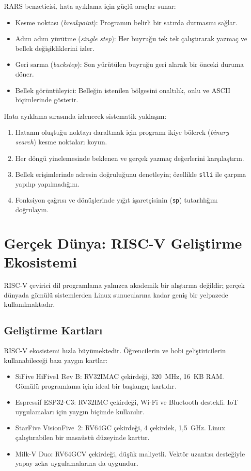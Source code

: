 RARS benzeticisi, hata ayıklama için güçlü araçlar sunar:

\begin{itemize}
\item Kesme noktası (\emph{breakpoint}): Programın belirli bir satırda durmasını sağlar.
\item Adım adım yürütme (\emph{single step}): Her buyruğu tek tek çalıştırarak yazmaç ve bellek değişikliklerini izler.
\item Geri sarma (\emph{backstep}): Son yürütülen buyruğu geri alarak bir önceki duruma döner.
\item Bellek görüntüleyici: Belleğin istenilen bölgesini onaltılık, onlu ve ASCII biçimlerinde gösterir.
\end{itemize}

Hata ayıklama sırasında izlenecek sistematik yaklaşım:
\begin{enumerate}
\item Hatanın oluştuğu noktayı daraltmak için programı ikiye bölerek (\emph{binary search}) kesme noktaları koyun.
\item Her döngü yinelemesinde beklenen ve gerçek yazmaç değerlerini karşılaştırın.
\item Bellek erişimlerinde adresin doğruluğunu denetleyin; özellikle \texttt{slli} ile çarpma yapılıp yapılmadığını.
\item Fonksiyon çağrısı ve dönüşlerinde yığıt işaretçisinin (\texttt{sp}) tutarlılığını doğrulayın.
\end{enumerate}


\section{Gerçek Dünya: RISC-V Geliştirme Ekosistemi}
\label{sec:gercek-dunya-programlama}

RISC-V çevirici dil programlama yalnızca akademik bir alıştırma değildir; gerçek dünyada gömülü sistemlerden Linux sunucularına kadar geniş bir yelpazede kullanılmaktadır.

\subsection{Geliştirme Kartları}

RISC-V ekosistemi hızla büyümektedir. Öğrencilerin ve hobi geliştiricilerin kullanabileceği bazı yaygın kartlar:

\begin{itemize}
\item SiFive HiFive1 Rev B: RV32IMAC çekirdeği, 320~MHz, 16~KB RAM. Gömülü programlama için ideal bir başlangıç kartıdır.
\item Espressif ESP32-C3: RV32IMC çekirdeği, Wi-Fi ve Bluetooth destekli. IoT uygulamaları için yaygın biçimde kullanılır.
\item StarFive VisionFive~2: RV64GC çekirdeği, 4 çekirdek, 1,5~GHz. Linux çalıştırabilen bir masaüstü düzeyinde karttır.
\item Milk-V Duo: RV64GCV çekirdeği, düşük maliyetli. Vektör uzantısı desteğiyle yapay zeka uygulamalarına da uygundur.
\end{itemize}

